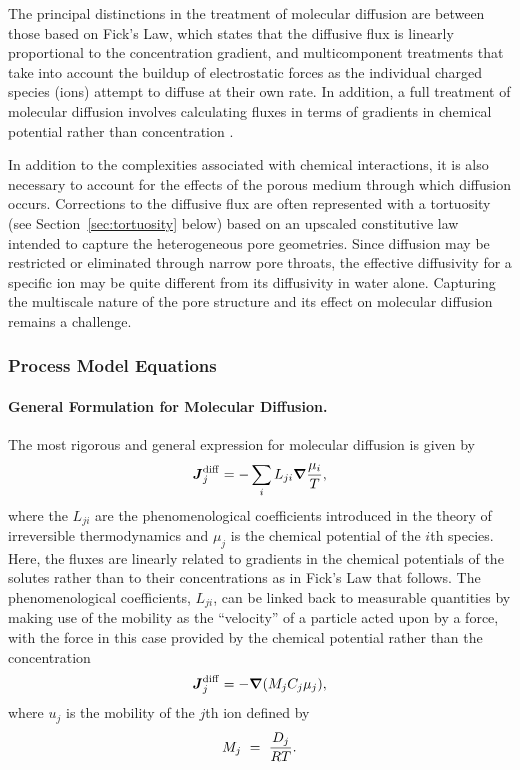 \noindent The principal distinctions in the treatment of molecular diffusion are between those based on Fick's Law, which states that the diffusive flux is linearly proportional to the concentration gradient, and multicomponent treatments that take into account the buildup of electrostatic forces as the individual charged species (ions) attempt to diffuse at their own rate.  In addition, a full treatment of molecular diffusion involves calculating fluxes in terms of gradients in chemical potential rather than concentration \citep{steefel2009fluid}.

\noindent In addition to the complexities associated with chemical interactions, it is also necessary to account for the effects of the porous medium through which diffusion occurs.  Corrections to the diffusive flux are often represented with a tortuosity (see Section~\ref{sec:tortuosity} below) based on an upscaled constitutive law intended to capture the heterogeneous pore geometries.  Since diffusion may be restricted or eliminated through narrow pore throats, the effective diffusivity for a specific ion may be quite different from its diffusivity in water alone.  Capturing the multiscale nature of the pore structure and its effect on molecular diffusion remains a challenge.



\subsubsection{Process Model Equations}

\paragraph{General Formulation for Molecular Diffusion.}

The most rigorous and general expression for molecular diffusion is given by
\begin{equation} \label{eq:OnsagerReciprocal} 
  \boldsymbol{J}_{j}^{\rm diff} =-\sum_{i}{L_{ji}\boldsymbol{\nabla}\frac{\mu _{i}}{T}},
\end{equation} 
where the $L_{ji}$ are the phenomenological coefficients introduced in
the theory of irreversible thermodynamics
\citep{onsager1931reciprocal,prigogine1968introduction,lasaga1998kinetic}
and $\mu_j$ is the chemical potential of the $i$th species.  Here, the
fluxes are linearly related to gradients in the chemical potentials of
the solutes rather than to their concentrations as in Fick's Law that
follows.  The phenomenological coefficients, $L_{ji}$, can be linked
back to measurable quantities by making use of the mobility as the
``velocity'' of a particle acted upon by a force, with the force in
this case provided by the chemical potential rather than the
concentration
\begin{equation} \label{eq:ChemicalPotentialGradient)} 
  \boldsymbol{J}_{j}^{\rm diff} =-\boldsymbol{\nabla} ( M_{j} C_{j} \mu _{j}), 
\end{equation} 
where $u_{j}$ is the mobility of the $j$th ion defined by
\begin{equation} \label{eq:IonMobility} 
  M_{j} \ =\  \frac{D_j}{RT}.
\end{equation} 



